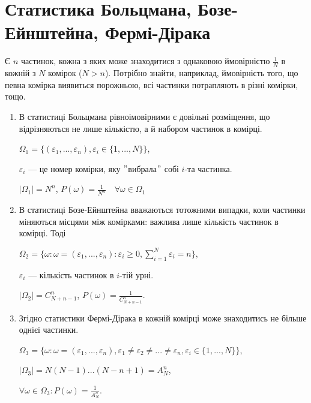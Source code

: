 \section{Статистика Больцмана, Бозе-Ейнштейна, Фермі-Дірака}

\begin{problem}
    Є $n$ частинок, кожна з яких може знаходитися з однаковою ймовірністю
    $\frac{1}{N}$ в кожній з $N$ комірок ($N > n$). Потрібно
    знайти, наприклад, ймовірність того, що певна комірка виявиться порожньою,
    всі частинки потрапляють в різні комірки, тощо.
\end{problem}
\begin{enumerate}
    \item В статистиці Больцмана рівноімовірними є довільні розміщення, що
    відрізняються не лише кількістю, а й набором частинок в комірці.
    
    $\Omega_1 = \{(\varepsilon_1, ..., \varepsilon_n), \varepsilon_i \in \{1, ..., N\}\}$,
    
    $\varepsilon_i$ --- це номер комірки, яку $"$вибрала$"$ собі $i$-та частинка.
    
    $|\Omega_1| = N^n$, $P(\omega) = \frac{1}{N^n} \quad \forall \omega \in \Omega_1$
    
    \item В статистиці Бозе-Ейнштейна вважаються тотожними випадки, коли
    частинки міняються місцями між комірками: важлива лише кількість
    частинок в комірці. Тоді
    
    $\Omega_2 = \{ \omega: \omega = (\varepsilon_1, ..., \varepsilon_n): \varepsilon_i \geqslant 0,
    \sum\limits_{i=1}^N \varepsilon_i = n \}$,
    
    $\varepsilon_i$ --- кількість частинок в $i$-тій урні.
    
    $|\Omega_2| = C_{N+n-1}^n$, $P(\omega) = \frac{1}{C_{N+n-1}^n}$.
    
    \item Згідно статистики Фермі-Дірака в кожній комірці може знаходитись
    не більше однієї частинки.
    
    $\Omega_3 = \{ \omega: \omega = (\varepsilon_1, ..., \varepsilon_n),
    \varepsilon_1 \neq \varepsilon_2 \neq ... \neq \varepsilon_n,
    \varepsilon_i \in \{1, ..., N\}\}$,
    
    $|\Omega_3| = N(N-1)...(N-n+1) = A_N^n$,
    
    $\forall \omega \in \Omega_3: P(\omega) = \frac{1}{A_N^n}$.
\end{enumerate}
    
    
    
    